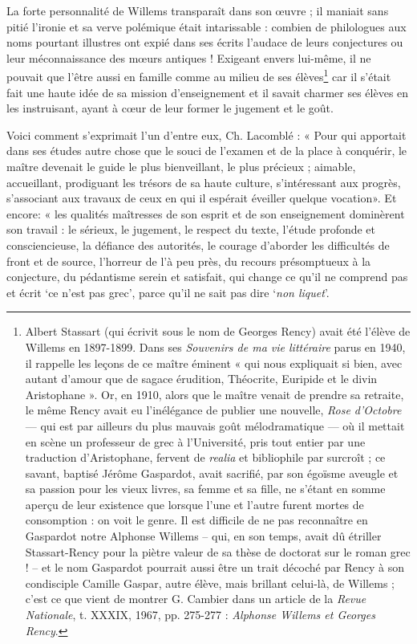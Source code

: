 \documentclass{book}%
\newcommand{\italique}[1]{\textit{#1}}%
\newcommand{\note}[1]{\footnote{#1}}
\begin{document}
La forte personnalité de Willems transparaît dans son œuvre ; il maniait sans pitié l'ironie et sa verve polémique était intarissable : combien de philologues aux noms pourtant illustres ont expié dans ses écrits l'audace de leurs conjectures ou leur méconnaissance des mœurs antiques ! Exigeant envers lui-même, il ne pouvait que l'être aussi en famille comme au milieu de ses élèves\note{Albert Stassart (qui écrivit sous le nom de Georges Rency) avait été l'élève de Willems en 1897-1899. Dans ses \italique{Souvenirs de ma vie littéraire} parus en 1940, il rappelle les leçons de ce maître éminent « qui nous expliquait si bien, avec autant d'amour que de sagace érudition, Théocrite, Euripide et le divin Aristophane ». Or, en 1910, alors que le maître venait de prendre sa retraite, le même Rency avait eu l'inélégance de publier une nouvelle, \italique{Rose d'Octobre} — qui est par ailleurs du plus mauvais goût mélodramatique — où il mettait en scène un professeur de grec à l'Université, pris tout entier par une traduction d'Aristophane, fervent de \italique{realia} et bibliophile par surcroît ; ce savant, baptisé Jérôme Gaspardot, avait sacrifié, par son égoïsme aveugle et sa passion pour les vieux livres, sa femme et sa fille, ne s'étant en somme aperçu de leur existence que lorsque l'une et l'autre furent mortes de consomption : on voit le genre. Il est difficile de ne pas reconnaître en Gaspardot notre Alphonse Willems -- qui, en son temps, avait dû étriller Stassart-Rency pour la piètre valeur de sa thèse de doctorat sur le roman grec ! -- et le nom Gaspardot pourrait aussi être un trait décoché par Rency à son condisciple Camille Gaspar, autre élève, mais brillant celui-là, de Willems ; c'est ce que vient de montrer G. Cambier dans un article de la \italique{Revue Nationale}, t. XXXIX, 1967, pp. 275-277 : \italique{Alphonse Willems et Georges Rency}.} car il s'était fait une haute idée de sa mission d'enseignement et il savait charmer ses élèves en les instruisant, ayant à cœur de leur former le jugement et le goût. 

Voici comment s'exprimait l'un d'entre eux, Ch. Lacomblé : « Pour qui apportait dans ses études autre chose que le souci de l'examen et de la place à conquérir, le maître devenait le guide le plus bienveillant, le plus précieux ; aimable, accueillant, prodiguant les trésors de sa haute culture, s'intéressant aux progrès, s'associant aux travaux de ceux en qui il espérait éveiller quelque vocation».
Et encore: « les qualités maîtresses de son esprit et de son enseignement dominèrent son travail : le sérieux, le jugement, le respect du texte, l'étude profonde et consciencieuse, la défiance des autorités, le courage d'aborder les difficultés de front et de source, l'horreur de l'à peu près, du recours présomptueux à la conjecture, du pédantisme serein et satisfait, qui change ce qu'il ne comprend pas et écrit `ce n'est pas grec', parce qu'il ne sait pas dire `\italique{non liquet}'. 
\end{document}

